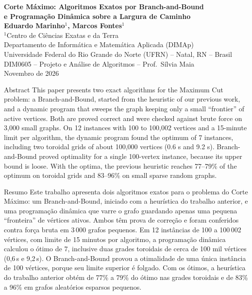 

\begin{center}
{\Large\bfseries Corte Máximo: Algoritmos Exatos por Branch-and-Bound\\ e Programação Dinâmica sobre a Largura de Caminho}\\[10pt]
{\bfseries Eduardo Marinho$^1$, Marcos Fontes$^1$}\\[6pt]
$^1$Centro de Ciências Exatas e da Terra\\
Departamento de Informática e Matemática Aplicada (DIMAp)\\
Universidade Federal do Rio Grande do Norte (UFRN) -- Natal, RN -- Brasil\\
DIM0605 -- Projeto e Análise de Algoritmos -- Prof.\ Sílvia Maia\\
Novembro de 2026
\end{center}
\vspace{6pt}
\begin{resumobloco}{Abstract}
This paper presents two exact algorithms for the Maximum Cut problem: a Branch-and-Bound, started from the heuristic of our previous work, and a dynamic program that sweeps the graph keeping only a small ``frontier'' of active vertices. Both are proved correct and were checked against brute force on 3,000 small graphs. On 12 instances with 100 to 100,002 vertices and a 15-minute limit per algorithm, the dynamic program found the optimum of 7 instances, including two toroidal grids of about 100,000 vertices (0.6 s and 9.2 s). Branch-and-Bound proved optimality for a single 100-vertex instance, because its upper bound is loose. With the optima, the previous heuristic reaches 77--79\% of the optimum on toroidal grids and 83--96\% on small sparse random graphs.
\end{resumobloco}
\vspace{8pt}
\begin{resumobloco}{Resumo}
Este trabalho apresenta dois algoritmos exatos para o problema do Corte Máximo: um Branch-and-Bound, iniciado com a heurística do trabalho anterior, e uma programação dinâmica que varre o grafo guardando apenas uma pequena ``fronteira'' de vértices ativos. Ambos têm prova de correção e foram conferidos contra força bruta em 3\,000 grafos pequenos. Em 12 instâncias de 100 a 100\,002 vértices, com limite de 15 minutos por algoritmo, a programação dinâmica calculou o ótimo de 7, inclusive duas grades toroidais de cerca de 100 mil vértices (0,6\,s e 9,2\,s). O Branch-and-Bound provou a otimalidade de uma única instância de 100 vértices, porque seu limite superior é folgado. Com os ótimos, a heurística do trabalho anterior obtém de 77\% a 79\% do ótimo nas grades toroidais e de 83\% a 96\% em grafos aleatórios esparsos pequenos.
\end{resumobloco}
\vspace{4pt}





\renewcommand{\refname}{Referências}


